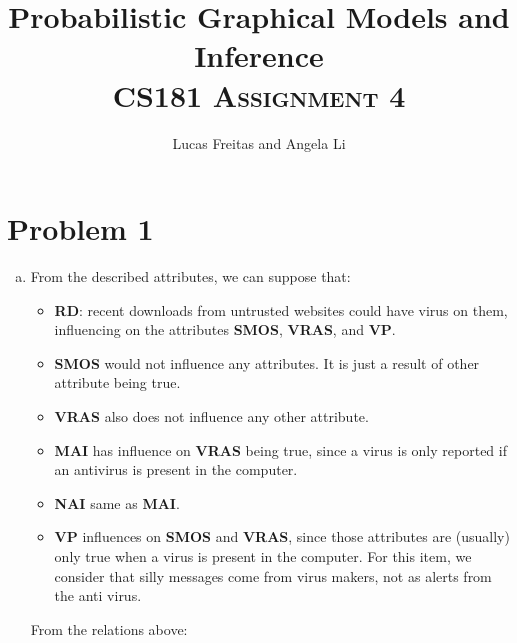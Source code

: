 \documentclass{article}
\begin{document}
\title{Probabilistic Graphical Models and Inference\\\textsc{CS181 Assignment 4}}
\author{Lucas Freitas and Angela Li}

\maketitle

\thispagestyle{empty}

    \section*{Problem 1}

        \begin{enumerate}[(a)]
            \item
                From the described attributes, we can suppose that:
                \begin{itemize}
                    \item
                        \textbf{RD}: recent downloads from untrusted websites could have virus on them, influencing on the attributes \textbf{SMOS}, \textbf{VRAS}, and \textbf{VP}.
                    \item
                        \textbf{SMOS} would not influence any attributes. It is just a result of other attribute being true.
                    \item
                        \textbf{VRAS} also does not influence any other attribute.
                    \item
                        \textbf{MAI} has influence on \textbf{VRAS} being true, since a virus is only reported if an antivirus is present in the computer.
                    \item
                        \textbf{NAI} same as \textbf{MAI}.
                    \item
                        \textbf{VP} influences on \textbf{SMOS} and \textbf{VRAS}, since those attributes are (usually) only true when a virus is present in the computer. For this item, we consider that silly messages come from virus makers, not as alerts from the anti virus.
                \end{itemize}

                From the relations above:
                 
                \begin{center}
\end{center}
\end{enumerate}
\end{document}
